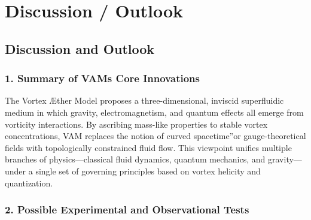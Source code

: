 \section{Discussion / Outlook}

\subsection*{Discussion and Outlook}

\subsubsection*{1. Summary of VAM\rqs s Core Innovations}
The Vortex Æther Model proposes a three-dimensional, inviscid superfluidic medium in which gravity, electromagnetism, and quantum effects all emerge from vorticity interactions. By ascribing mass-like properties to stable vortex concentrations, VAM replaces the notion of \grqq curved spacetime\textquotedblright or gauge-theoretical fields with topologically constrained fluid flow. This viewpoint unifies multiple branches of physics—classical fluid dynamics, quantum mechanics, and gravity—under a single set of governing principles based on vortex helicity and quantization.

\subsubsection*{2. Possible Experimental and Observational Tests}

